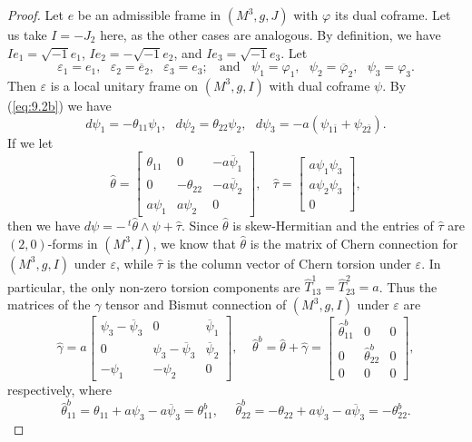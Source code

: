 \documentclass{amsart}
\numberwithin{equation}{section}
\theoremstyle{definition}
\renewcommand{\1}{\mathds{1}}
\renewcommand{\>}{\rightarrow}
\begin{document}
\begin{proof}
Let $e$ be an admissible frame in $(M^3,g,J)$ with $\varphi$ its dual coframe. Let us take $I=-J_2$ here, as the other cases are analogous. By definition, we have $Ie_1=\sqrt{-1}e_1$, $Ie_2=-\sqrt{-1}e_2$, and $Ie_3=\sqrt{-1}e_3$.
Let
$$\varepsilon_1=e_1, \ \ \ \varepsilon_2 =\overline{e}_2, \ \ \  \varepsilon_3=e_3; \ \ \ \ \mbox{and} \ \ \ \ \psi_1=\varphi_1, \ \ \ \psi_2=\overline{\varphi}_2, \ \ \ \psi_3=\varphi_3. $$
Then $\varepsilon$ is a local unitary frame on $(M^3,g,I)$ with dual coframe $\psi$. By (\ref{eq:9.2b}) we have
$$ d\psi_1=-\theta_{11}\psi_1,\ \ \ d\psi_2=\theta_{22}\psi_2, \ \ \ d\psi_3 = -a (\psi_{1\bar{1}} + \psi_{2\bar{2}}). $$
If we let
$$ \hat{\theta} = \left[ \begin{array}{ccc} \theta_{11} & 0 & -a\overline{\psi}_1 \\ 0 & -\theta_{22} &  -a\overline{\psi}_2 \\ a\psi_1 & a\psi_2 & 0 \end{array} \right], \ \ \ \ \hat{\tau} = \left[ \begin{array}{c} a\psi_1\psi_3 \\ a\psi_2\psi_3  \\ 0  \end{array} \right] ,$$
then we have $d\psi = -\,^t\!\hat{\theta}\wedge \psi + \hat{\tau}$. Since $\hat{\theta}$ is skew-Hermitian and the entries of $\hat{\tau}$ are $(2,0)$-forms in $(M^3,I)$, we know that $\hat{\theta}$ is the matrix of Chern connection for $(M^3,g,I)$ under $\varepsilon$, while $\hat{\tau}$ is the column vector of Chern torsion under $\varepsilon$. In particular, the only non-zero torsion components are $\hat{T}^1_{13}=\hat{T}^2_{23}=a$. Thus the matrices of the $\gamma$ tensor  and Bismut connection of $(M^3,g,I)$ under $\varepsilon$ are
$$ \hat{\gamma} =   a \left[ \begin{array}{ccc} \psi_3 - \overline{\psi}_3  & 0 & \overline{\psi}_1 \\ 0 & \psi_3 - \overline{\psi}_3 &  \overline{\psi}_2 \\ -\psi_1 & -\psi_2 & 0 \end{array} \right] , \ \ \ \ \ \hat{\theta}^b = \hat{\theta}+\hat{\gamma} = \left[ \begin{array}{ccc} \hat{\theta}^b_{11}  & 0 & 0 \\ 0 & \hat{\theta}^b_{22} &  0 \\ 0 & 0 & 0 \end{array} \right],$$
respectively, where
$$\hat{\theta}^b_{11} = \theta_{11} + a\psi_3 -a\overline{\psi}_3 = \theta^b_{11}, \ \ \ \ \ \ \hat{\theta}^b_{22} = -\theta_{22} + a\psi_3 -a\overline{\psi}_3 = - \theta^b_{22}. $$

\end{proof}
\end{document}
